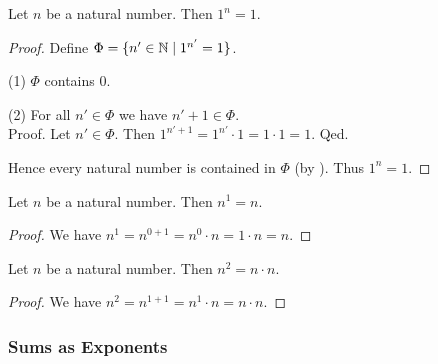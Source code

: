 \documentclass[10pt]{article}
\begin{document}
  \begin{forthel}
    \begin{proposition}
      Let $n$ be a natural number.
      Then $1^{n} = 1$.
    \end{proposition}
    \begin{proof}
      Define $\Phi = \{ n' \in \mathbb{N} \mid 1^{n'} = 1 \}$.

      (1) $\Phi$ contains $0$.

      (2) For all $n' \in \Phi$ we have $n' + 1 \in \Phi$. \\
      Proof.
        Let $n' \in \Phi$.
        Then $1^{n' + 1}
          = 1^{n'} \cdot 1
          = 1 \cdot 1
          = 1$.
      Qed.

      Hence every natural number is contained in $\Phi$ (by ).
      Thus $1^{n} = 1$.
    \end{proof}
  \end{forthel}

  \begin{forthel}
    \begin{proposition}
      Let $n$ be a natural number.
      Then $n^{1} = n$.
    \end{proposition}
    \begin{proof}
      We have $n^{1}
        = n^{0 + 1}
        = n^{0} \cdot n
        = 1 \cdot n
        = n$.
    \end{proof}
  \end{forthel}

  \begin{forthel}
    \begin{proposition}
      Let $n$ be a natural number.
      Then $n^{2} = n \cdot n$.
    \end{proposition}
    \begin{proof}
      We have $n^{2}
        = n^{1 + 1}
        = n^{1} \cdot n
        = n \cdot n$.
    \end{proof}
  \end{forthel}


  \subsubsection*{Sums as Exponents}
\end{document}
